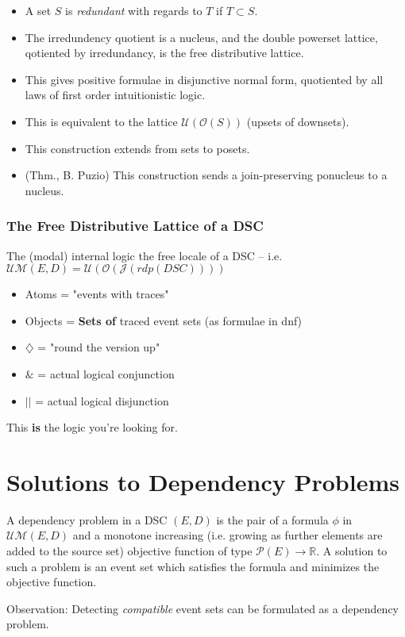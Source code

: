 \documentclass{beamer}
\newcommand{\UMc}{\mathcal{UM}}
\newcommand{\Oc}{\mathcal{O}}
\newcommand{\Pc}{\mathcal{P}}
\newcommand{\Ucc}{\mathcal{U}}
\newcommand{\Jc}{\mathcal{J}}
\newcommand{\Dia}{\diamondsuit}
\begin{document}
\begin{frame}
\begin{itemize}
\item A set \(S\) is \textit{redundant} with regards to \(T\) if \(T \subset S\). 
\item The irredundency quotient is a nucleus, and the double powerset lattice, qotiented by irredundancy, is the free distributive lattice. 
\item This gives positive formulae in disjunctive normal form, quotiented by all laws of first order intuitionistic logic.
\item This is equivalent to the lattice \(\Ucc(\Oc(S))\) (upsets of downsets).
\item This construction extends from sets to posets.
\item (Thm., B. Puzio) This construction sends a join-preserving ponucleus to a nucleus.
\end{itemize}
\end{frame}

\begin{frame}
\frametitle{The Free Distributive Lattice of a DSC}
The (modal) internal logic the free locale of a DSC -- i.e. \(\UMc(E,D)  = \Ucc(\Oc(\Jc(rdp(DSC))))\)

\begin{itemize}
\item Atoms = "events with traces"
\item Objects = \textbf{Sets of} traced event sets (as formulae in dnf)
\item \(\Dia\) =  "round the version up"
\item \(\&\) = actual logical conjunction
\item \(||\) = actual logical disjunction
\end{itemize}

This \textbf{is} the logic you're looking for.

\end{frame}

\section{Solutions to Dependency Problems}
\begin{frame}
\begin{definition}
A dependency problem in a DSC \((E,D)\) is the pair of a formula \(\phi\) in \(\UMc(E,D)\) and a monotone increasing (i.e. growing as further elements are added to the source set) objective function of type \(\Pc(E) \rightarrow \mathbb{R}\). A solution to such a problem is an event set which satisfies the formula and minimizes the objective function.
\end{definition}

Observation: Detecting \textit{compatible} event sets can be formulated as a dependency problem.
\end{frame}
\end{document}
